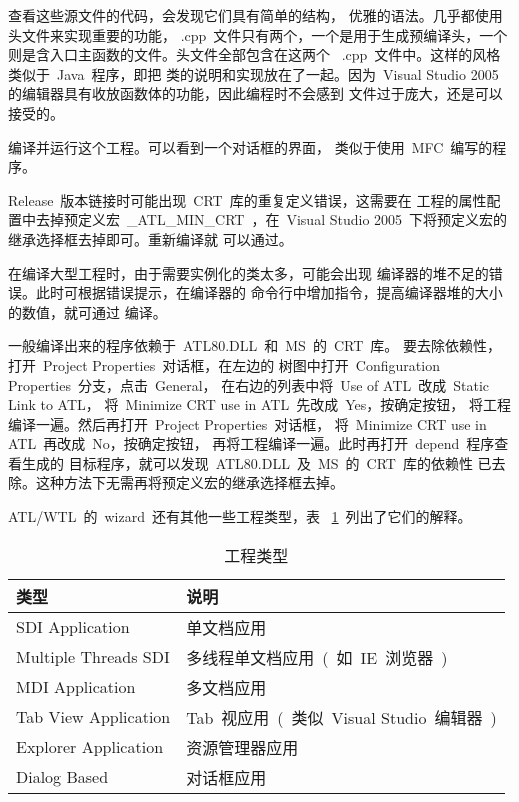 查看这些源文件的代码，会发现它们具有简单的结构，
优雅的语法。几乎都使用头文件来实现重要的功能，
.cpp~文件只有两个，一个是用于生成预编译头，一个
则是含入口主函数的文件。头文件全部包含在这两个
~.cpp~文件中。这样的风格类似于~Java~程序，即把
类的说明和实现放在了一起。因为~Visual Studio 2005~
的编辑器具有收放函数体的功能，因此编程时不会感到
文件过于庞大，还是可以接受的。

编译并运行这个工程。可以看到一个对话框的界面，
类似于使用~MFC~编写的程序。

\begin{description}
    \item [注意]
Release~版本链接时可能出现~CRT~库的重复定义错误，这需要在
工程的属性配置中去掉预定义宏~\_ATL\_MIN\_CRT~，在~Visual
Studio 2005~下将预定义宏的继承选择框去掉即可。重新编译就
可以通过。

    \item [注意]
在编译大型工程时，由于需要实例化的类太多，可能会出现
编译器的堆不足的错误。此时可根据错误提示，在编译器的
命令行中增加指令，提高编译器堆的大小的数值，就可通过
编译。

    \item [注意]
一般编译出来的程序依赖于~ATL80.DLL~和~MS~的~CRT~库。
要去除依赖性，打开~Project Properties~对话框，在左边的
树图中打开~Configuration Properties~分支，点击~General，
在右边的列表中将~Use of ATL~改成~Static Link to ATL，
将~Minimize CRT use in ATL~先改成~Yes，按确定按钮，
将工程编译一遍。然后再打开~Project Properties~对话框，
将~Minimize CRT use in ATL~再改成~No，按确定按钮，
再将工程编译一遍。此时再打开~depend~程序查看生成的
目标程序，就可以发现~ATL80.DLL~及~MS~的~CRT~库的依赖性
已去除。这种方法下无需再将预定义宏的继承选择框去掉。

\end{description}

ATL/WTL~的~wizard~还有其他一些工程类型，表
~\ref{tab:setup:project}~列出了它们的解释。
\begin{table}[h]
  \centering
  \caption{工程类型}\label{tab:setup:project}
\begin{tabular}{|l|l|}
  \hline
  \textbf{类型} & \textbf{说明} \\
  \hline\hline
  SDI Application & 单文档应用 \\
  \hline
  Multiple Threads SDI
  & 多线程单文档应用~(~如~IE~浏览器~) \\
  \hline
  MDI Application & 多文档应用 \\
  \hline
  Tab View Application
  & Tab~视应用~(~类似~Visual Studio~编辑器~) \\
  \hline
  Explorer Application & 资源管理器应用 \\
  \hline
  Dialog Based & 对话框应用 \\
  \hline
\end{tabular}

\end{table}


